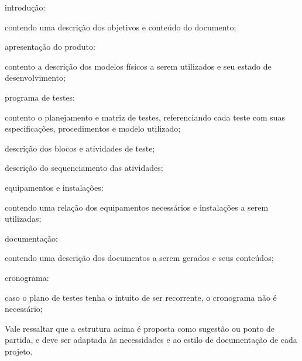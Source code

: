 \begin{alineas}
    \item introdução:
    \begin{alineas}
        \item contendo uma descrição dos objetivos e conteúdo do documento;
    \end{alineas}

    \item apresentação do produto:
    \begin{alineas}
        \item contento a descrição dos modelos físicos a serem utilizados e seu estado de desenvolvimento;
    \end{alineas}

    \item programa de testes:
    \begin{alineas}
        \item contento o planejamento e matriz de testes, referenciando cada teste com suas especificações, procedimentos e modelo utilizado;
        \item descrição dos blocos e atividades de teste;
        \item descrição do sequenciamento das atividades;
    \end{alineas}

    \item equipamentos e instalações:
    \begin{alineas}
        \item contendo uma relação dos equipamentos necessários e instalações a serem utilizadas;
    \end{alineas}

    \item documentação:
    \begin{alineas}
        \item contendo uma descrição dos documentos a serem gerados e seus conteúdos;
    \end{alineas}

    \item cronograma:
    \begin{alineas}
        \item caso o plano de testes tenha o intuito de ser recorrente, o cronograma não é necessário;
    \end{alineas}

\end{alineas}

Vale ressaltar que a estrutura acima é proposta como sugestão ou ponto de partida, e deve ser adaptada às necessidades e ao estilo de documentação de cada projeto.


